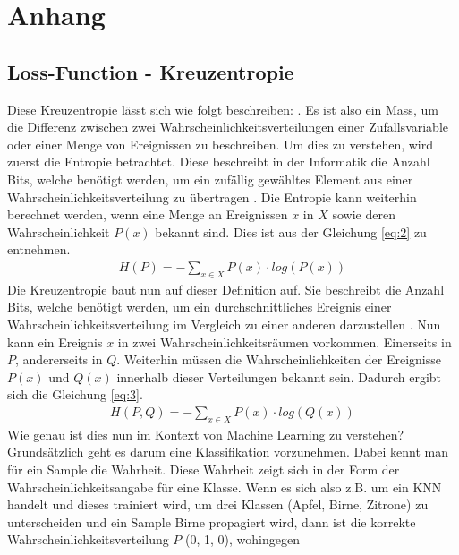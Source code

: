 \chapter{Anhang}
\section{Loss-Function - Kreuzentropie}\label{anhang:kreuzentropie}
Diese Kreuzentropie lässt sich wie folgt beschreiben:  \cite{machinelearningmastery:1:crossEntropy}.
Es ist also ein Mass, um die Differenz zwischen zwei Wahrscheinlichkeitsverteilungen einer Zufallsvariable oder einer
Menge von Ereignissen zu beschreiben. Um dies zu verstehen, wird zuerst die Entropie betrachtet. Diese beschreibt in der
Informatik die Anzahl Bits, welche benötigt werden, um ein zufällig gewähltes Element aus einer Wahrscheinlichkeitsverteilung
zu übertragen \cite{machinelearningmastery:1:crossEntropy}. Die Entropie kann weiterhin berechnet werden, wenn eine Menge
an Ereignissen $x$ in $X$ sowie deren Wahrscheinlichkeit $P(x)$ bekannt sind. Dies ist aus der Gleichung \ref{eq:2} zu entnehmen.
\begin{align}
    H(P) = - \sum_{x \in X} P(x) \cdot log(P(x)) \label{eq:2}
\end{align}
Die Kreuzentropie baut nun auf dieser Definition auf. Sie beschreibt die Anzahl Bits, welche benötigt werden, um ein
durchschnittliches Ereignis einer Wahrscheinlichkeitsverteilung im Vergleich zu einer anderen darzustellen \cite{machinelearningmastery:1:crossEntropy}.
Nun kann ein Ereignis $x$ in zwei Wahrscheinlichkeitsräumen vorkommen. Einerseits in $P$, andererseits in $Q$. Weiterhin
müssen die Wahrscheinlichkeiten der Ereignisse $P(x)$ und $Q(x)$ innerhalb dieser Verteilungen bekannt sein. Dadurch ergibt
sich die Gleichung \ref{eq:3}.
\begin{align}
    H(P,Q) = - \sum_{x \in X} P(x) \cdot log(Q(x)) \label{eq:3}
\end{align}
Wie genau ist dies nun im Kontext von Machine Learning zu verstehen? Grundsätzlich geht es darum eine Klassifikation vorzunehmen.
Dabei kennt man für ein Sample die Wahrheit. Diese Wahrheit zeigt sich in der Form der Wahrscheinlichkeitsangabe für eine Klasse.
Wenn es sich also z.B. um ein KNN handelt und dieses trainiert wird, um drei Klassen (Apfel, Birne, Zitrone) zu unterscheiden und
ein Sample \glqq Birne\grqq{} propagiert wird, dann ist die korrekte Wahrscheinlichkeitsverteilung $P$ (0, 1, 0), wohingegen
